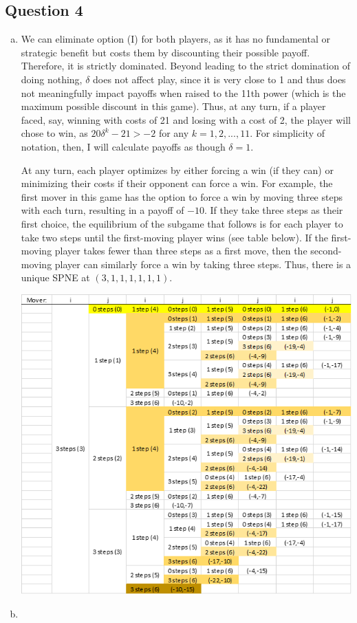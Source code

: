 \documentclass{article}
\begin{document}

\subsection*{Question 4}

\begin{enumerate}[(a)]
	\item We can eliminate option (I) for both players, as it has no fundamental or strategic benefit but costs them by discounting their possible payoff. Therefore, it is strictly dominated. Beyond leading to the strict domination of doing nothing, $\delta$ does not affect play, since it is very close to 1 and thus does not meaningfully impact payoffs when raised to the 11th power (which is the maximum possible discount in this game). Thus, at any turn, if a player faced, say, winning with costs of 21 and losing with a cost of 2, the player will chose to win, as ${20\delta^k-21>-2}$ for any ${k=1,2,...,11}$. For simplicity of notation, then, I will calculate payoffs as though ${\delta=1}$.
	
	At any turn, each player optimizes by either forcing a win (if they can) or minimizing their costs if their opponent can force a win. For example, the first mover in this game has the option to force a win by moving three steps with each turn, resulting in a payoff of $-10$. If they take three steps as their first choice, the equilibrium of the subgame that follows is for each player to take two steps until the first-moving player wins (see table below). If the first-moving player takes fewer than three steps as a first move, then the second-moving player can similarly force a win by taking three steps. Thus, there is a unique SPNE at $(3,1,1,1,1,1,1)$.
		\begin{center}
			\includegraphics[scale=.5]{table4a.png}
		\end{center}
	
	\item 
	
	
\end{enumerate}
\end{document}
